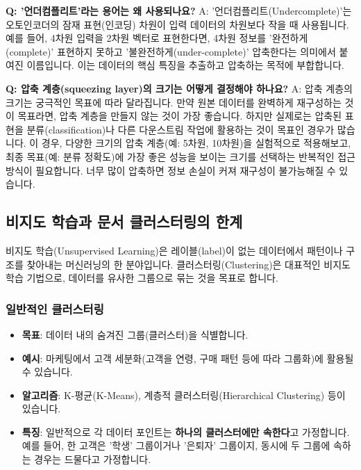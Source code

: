 \documentclass[11pt,a4paper]{article}
\begin{document}
\begin{faqbox}
\textbf{Q: '언더컴플리트'라는 용어는 왜 사용되나요?}
A: '언더컴플리트(Undercomplete)'는 오토인코더의 잠재 표현(인코딩) 차원이 입력 데이터의 차원보다 작을 때 사용됩니다. 예를 들어, 4차원 입력을 2차원 벡터로 표현한다면, 4차원 정보를 '완전하게(complete)' 표현하지 못하고 '불완전하게(under-complete)' 압축한다는 의미에서 붙여진 이름입니다. 이는 데이터의 핵심 특징을 추출하고 압축하는 목적에 부합합니다.

\textbf{Q: 압축 계층(squeezing layer)의 크기는 어떻게 결정해야 하나요?}
A: 압축 계층의 크기는 궁극적인 목표에 따라 달라집니다. 만약 원본 데이터를 완벽하게 재구성하는 것이 목표라면, 압축 계층을 만들지 않는 것이 가장 좋습니다. 하지만 실제로는 압축된 표현을 분류(classification)나 다른 다운스트림 작업에 활용하는 것이 목표인 경우가 많습니다. 이 경우, 다양한 크기의 압축 계층(예: 5차원, 10차원)을 실험적으로 적용해보고, 최종 목표(예: 분류 정확도)에 가장 좋은 성능을 보이는 크기를 선택하는 반복적인 접근 방식이 필요합니다. 너무 많이 압축하면 정보 손실이 커져 재구성이 불가능해질 수 있습니다.
\end{faqbox}

\newpage
\subsection*{비지도 학습과 문서 클러스터링의 한계}
\begin{conceptbox}
비지도 학습(Unsupervised Learning)은 레이블(label)이 없는 데이터에서 패턴이나 구조를 찾아내는 머신러닝의 한 분야입니다.
클러스터링(Clustering)은 대표적인 비지도 학습 기법으로, 데이터를 유사한 그룹으로 묶는 것을 목표로 합니다.
\end{conceptbox}

\subsubsection*{일반적인 클러스터링}
\begin{itemize}
    \item \textbf{목표}: 데이터 내의 숨겨진 그룹(클러스터)을 식별합니다.
    \item \textbf{예시}: 마케팅에서 고객 세분화(고객을 연령, 구매 패턴 등에 따라 그룹화)에 활용될 수 있습니다.
    \item \textbf{알고리즘}: K-평균(K-Means), 계층적 클러스터링(Hierarchical Clustering) 등이 있습니다.
    \item \textbf{특징}: 일반적으로 각 데이터 포인트는 \textbf{하나의 클러스터에만 속한다}고 가정합니다. 예를 들어, 한 고객은 '학생' 그룹이거나 '은퇴자' 그룹이지, 동시에 두 그룹에 속하는 경우는 드물다고 가정합니다.
\end{itemize}
\end{document}
